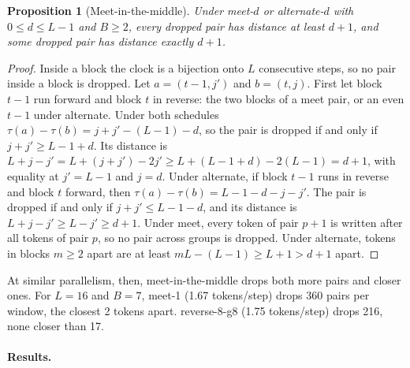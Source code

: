 \documentclass[11pt]{article}
\newtheorem{proposition}{Proposition}
\theoremstyle{definition}
\theoremstyle{remark}
\newcommand{\sch}[1]{\textsf{#1}}
\begin{document}
\begin{proposition}[Meet-in-the-middle]
\label{prop:meet}
Under \sch{meet-$d$} or \sch{alternate-$d$} with $0\le d\le L-1$ and $B\ge2$, every dropped pair has distance at least $d+1$, and some dropped pair has distance exactly $d+1$.
\end{proposition}

\begin{proof}
Inside a block the clock is a bijection onto $L$ consecutive steps, so no pair inside a block is dropped.
Let $a=(t-1,j')$ and $b=(t,j)$.
First let block $t-1$ run forward and block $t$ in reverse: the two blocks of a \sch{meet} pair, or an even $t-1$ under \sch{alternate}.
Under both schedules $\tau(a)-\tau(b)=j+j'-(L-1)-d$, so the pair is dropped if and only if $j+j'\ge L-1+d$.
Its distance is $L+j-j'=L+(j+j')-2j'\ge L+(L-1+d)-2(L-1)=d+1$, with equality at $j'=L-1$ and $j=d$.
Under \sch{alternate}, if block $t-1$ runs in reverse and block $t$ forward, then $\tau(a)-\tau(b)=L-1-d-j-j'$.
The pair is dropped if and only if $j+j'\le L-1-d$, and its distance is $L+j-j'\ge L-j'\ge d+1$.
Under \sch{meet}, every token of pair $p+1$ is written after all tokens of pair $p$, so no pair across groups is dropped.
Under \sch{alternate}, tokens in blocks $m\ge2$ apart are at least $mL-(L-1)\ge L+1>d+1$ apart.
\end{proof}

At similar parallelism, then, meet-in-the-middle drops both more pairs and closer ones.
For $L=16$ and $B=7$, \sch{meet-1} (1.67 tokens/step) drops 360 pairs per window, the closest 2 tokens apart.
\sch{reverse-8-g8} (1.75 tokens/step) drops 216, none closer than 17.

\paragraph{Results.}
\end{document}
